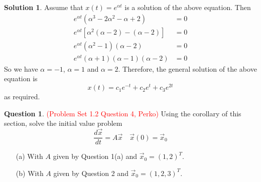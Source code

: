 \documentclass[11pt]{article}
\theoremstyle{definition}\newtheorem{definition}{Definition}
\theoremstyle{definition}\newtheorem{question}{Question}
\theoremstyle{definition}\newtheorem*{solution}{Solution}
\theoremstyle{definition}\newtheorem{example}{Example}
\theoremstyle{definition}\newtheorem{notation}{Notation}
\theoremstyle{theorem}\newtheorem{theorem}{Theorem}
\theoremstyle{theorem}\newtheorem{corollary}{Corollary}
\theoremstyle{theorem}\newtheorem{lemma}{Lemma}
\theoremstyle{theorem}\newtheorem{proposition}{Proposition}
\begin{document}
\begin{solution}
    Assume that $x(t) = e^{\alpha t}$ is a solution of the above equation. Then
    \begin{align*}
        e^{\alpha t}(\alpha^3 - 2\alpha^2 - \alpha + 2) &= 0 \\
        e^{\alpha t}[\alpha^2(\alpha - 2) - (\alpha - 2)] &= 0 \\
        e^{\alpha t}(\alpha^2 - 1)(\alpha - 2) &= 0 \\
        e^{\alpha t}(\alpha + 1)(\alpha - 1)(\alpha - 2) &= 0
    \end{align*}
    So we have $\alpha = -1$, $\alpha = 1$ and $\alpha = 2$. Therefore, the general solution of the above equation is
    \begin{equation*}
        x(t) = c_1e^{-t} + c_2e^t + c_3e^{2t}
    \end{equation*}
    as required.
\end{solution}

\begin{question}
    \textcolor{red}{(Problem Set 1.2 Question 4, Perko)} Using the corollary of this section, solve the initial value problem
    \begin{equation*}
        \frac{d\vec{x}}{dt} = A\vec{x} \quad \vec{x}(0) = \vec{x}_0
    \end{equation*}
    \begin{itemize}
        \item[(a)] With $A$ given by Question 1(a) and $\vec{x}_0 = (1, 2)^T$.
        \item[(b)] With $A$ given by Question 2 and $\vec{x}_0 = (1, 2, 3)^T$.
    \end{itemize}
\end{question}
\end{document}
